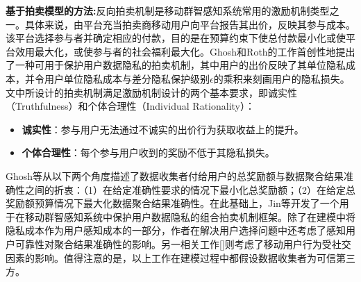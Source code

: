 \noindent\textbf{基于拍卖模型的方法:}反向拍卖机制是移动群智感知系统常用的激励机制类型之一。具体来说，由平台充当拍卖商移动用户向平台报告其出价，反映其参与成本。该平台选择参与者并确定相应的付款，目的是在预算约束下使总付款最小化或使平台效用最大化，或使参与者的社会福利最大化\cite{DejunJ}。Ghosh和Roth的工作\cite{ghosh2015selling}首创性地提出了一种可用于保护用户数据隐私的拍卖机制，其中用户的出价反映了其单位隐私成本，并令用户单位隐私成本与差分隐私保护级别$\epsilon$的乘积来刻画用户的隐私损失。文中所设计的拍卖机制满足激励机制设计的两个基本要求，即诚实性（Truthfulness）和个体合理性（Individual Rationality）：
\begin{itemize}
\item \textbf{诚实性}：参与用户无法通过不诚实的出价行为获取收益上的提升。
\item \textbf{个体合理性}：每个参与用户收到的奖励不低于其隐私损失。
\end{itemize}
Ghosh等\cite{ghosh2015selling}从以下两个角度描述了数据收集者付给用户的总奖励额与数据聚合结果准确性之间的折衷：（1）在给定准确性要求的情况下最小化总奖励额；（2）在给定总奖励额预算情况下最大化数据聚合结果准确性。在此基础上，Jin等\cite{jin2016inception}开发了一个用于在移动群智感知系统中保护用户数据隐私的组合拍卖机制框架。除了在建模中将隐私成本作为用户感知成本的一部分，作者在解决用户选择问题中还考虑了感知用户可靠性对聚合结果准确性的影响。另一相关工作[]则考虑了移动用户行为受社交因素的影响。值得注意的是，以上工作在建模过程中都假设数据收集者为可信第三方。

